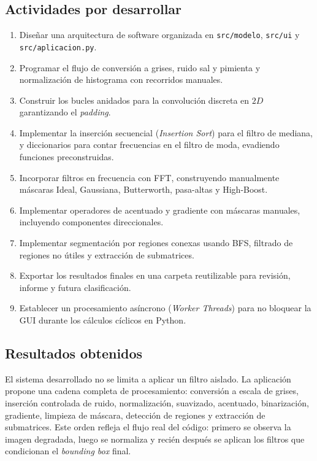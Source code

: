 \documentclass[11pt]{article}
\begin{document}
\subsection{Actividades por desarrollar}
\begin{enumerate}
    \item Diseñar una arquitectura de software organizada en \texttt{src/modelo}, \texttt{src/ui} y \texttt{src/aplicacion.py}.
    \item Programar el flujo de conversión a grises, ruido sal y pimienta y normalización de histograma con recorridos manuales.
    \item Construir los bucles anidados para la convolución discreta en $2D$ garantizando el \textit{padding}.
    \item Implementar la inserción secuencial (\textit{Insertion Sort}) para el filtro de mediana, y diccionarios para contar frecuencias en el filtro de moda, evadiendo funciones preconstruidas.
    \item Incorporar filtros en frecuencia con FFT, construyendo manualmente máscaras Ideal, Gaussiana, Butterworth, pasa-altas y High-Boost.
    \item Implementar operadores de acentuado y gradiente con máscaras manuales, incluyendo componentes direccionales.
    \item Implementar segmentación por regiones conexas usando BFS, filtrado de regiones no útiles y extracción de submatrices.
    \item Exportar los resultados finales en una carpeta reutilizable para revisión, informe y futura clasificación.
    \item Establecer un procesamiento asíncrono (\textit{Worker Threads}) para no bloquear la GUI durante los cálculos cíclicos en Python.
\end{enumerate}

\subsection{Resultados obtenidos}

El sistema desarrollado no se limita a aplicar un filtro aislado. La aplicación propone una cadena completa de procesamiento: conversión a escala de grises, inserción controlada de ruido, normalización, suavizado, acentuado, binarización, gradiente, limpieza de máscara, detección de regiones y extracción de submatrices. Este orden refleja el flujo real del código: primero se observa la imagen degradada, luego se normaliza y recién después se aplican los filtros que condicionan el \textit{bounding box} final.
\end{document}
